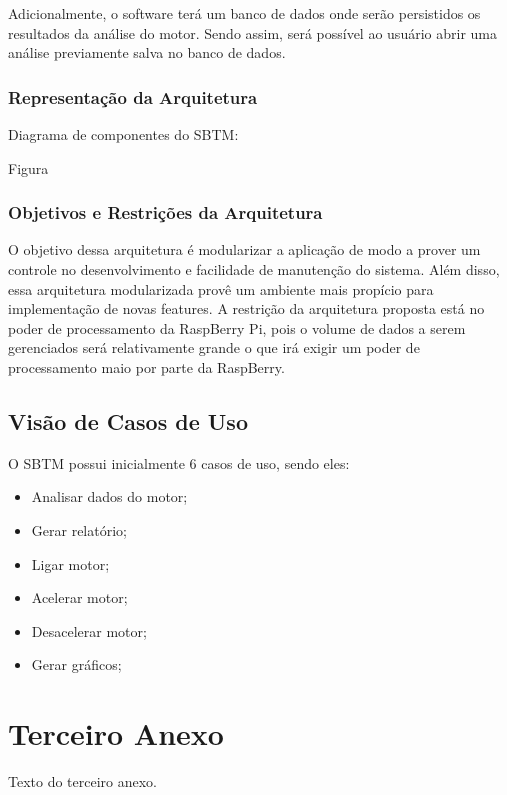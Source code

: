 \begin{anexosenv}
Adicionalmente, o software terá um banco de dados onde serão persistidos os resultados da análise do motor. Sendo assim, será possível ao usuário abrir uma análise previamente salva no banco de dados.

\subsection{Representação da Arquitetura}

Diagrama de componentes do SBTM:

Figura

\subsection{Objetivos e Restrições da Arquitetura}

O objetivo dessa arquitetura é modularizar a aplicação de modo a prover um controle no desenvolvimento e facilidade de manutenção do sistema. Além disso, essa arquitetura modularizada provê um ambiente mais propício para implementação de novas features.
A restrição da arquitetura proposta está no poder de processamento da RaspBerry Pi, pois o volume de dados a serem gerenciados será relativamente grande	o que irá exigir um poder de processamento maio por parte da RaspBerry.

\section{Visão de Casos de Uso}

O SBTM possui inicialmente 6 casos de uso, sendo eles:

\begin{itemize}
	\item Analisar dados do motor;
	\item Gerar relatório;
	\item Ligar motor;
	\item Acelerar motor;
	\item Desacelerar motor;
	\item Gerar gráficos;
\end{itemize}

\chapter{Terceiro Anexo}

Texto do terceiro anexo.

\end{anexosenv}


